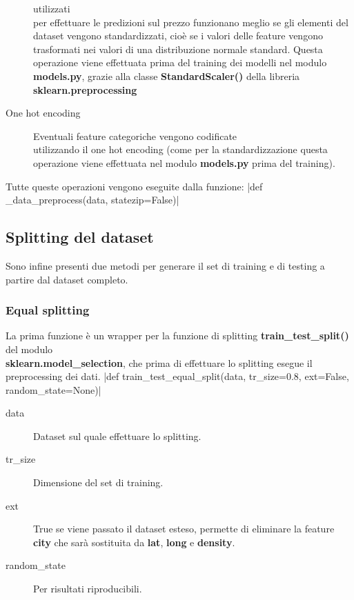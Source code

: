 \documentclass{article}
\begin{document}
\begin{description}
		utilizzati \\per effettuare le predizioni sul prezzo funzionano meglio
		se gli elementi del dataset vengono standardizzati, cioè se i valori
		delle feature vengono trasformati nei valori di una distribuzione
		normale standard. Questa operazione viene effettuata prima del training
		dei modelli nel modulo \textbf{models.py}, grazie alla classe
		\textbf{StandardScaler()} della libreria \\
		\textbf{sklearn.preprocessing}
	\item[One hot encoding] Eventuali feature categoriche vengono codificate\\
		utilizzando il one hot encoding (come per la standardizzazione questa
		operazione viene effettuata nel modulo \textbf{models.py} prima del
		training).
\end{description}
Tutte queste operazioni vengono eseguite dalla funzione:
|def _data_preprocess(data, statezip=False)|

\subsection{Splitting del dataset}
Sono infine presenti due metodi per generare il set di training e di testing a
partire dal dataset completo.

\subsubsection{Equal splitting}
\label{sec:eqsplit}
La prima funzione è un wrapper per la funzione di splitting
\textbf{train\_test\_split()} del modulo \\\textbf{sklearn.model\_selection},
che prima di effettuare lo splitting esegue il preprocessing dei dati.
|def train_test_equal_split(data, tr_size=0.8, ext=False, random_state=None)|
\begin{description}
	\item[data] Dataset sul quale effettuare lo splitting.
	\item[tr\_size] Dimensione del set di training.
	\item[ext] True se viene passato il dataset esteso, permette di eliminare
		la feature \textbf{city} che sarà sostituita da \textbf{lat},
		\textbf{long} e \textbf{density}.
	\item[random\_state] Per risultati riproducibili.
\end{description}
\end{document}
